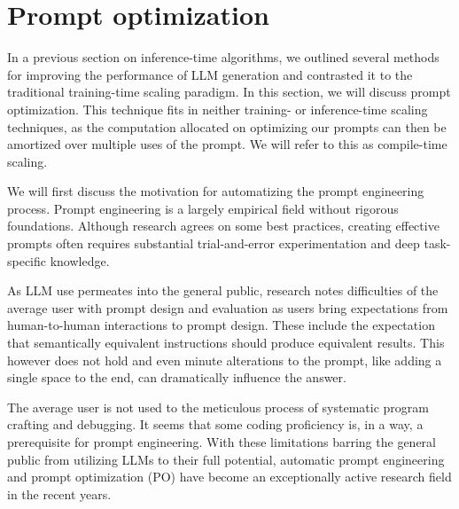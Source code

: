 \section{Prompt optimization}
In a previous section on inference-time algorithms, we outlined several methods for improving the performance of LLM generation
and contrasted it to the traditional training-time scaling paradigm. In this section, we will discuss prompt optimization. 
This technique fits in neither training- or inference-time scaling techniques, as the computation allocated on
optimizing our prompts can then be amortized over multiple uses of the prompt. 
We will refer to this as compile-time\cite{schnabel2024symbolicpromptprogramsearch} scaling.

We will first discuss the motivation for automatizing the prompt engineering process. 
Prompt engineering is a largely empirical field without rigorous foundations.
Although research agrees on some best practices, creating effective prompts 
often requires substantial trial-and-error experimentation and deep task-specific 
knowledge\cite{xiang2025selfsupervisedpromptoptimization}.

As LLM use permeates into the general public, research\cite{10.1145/3544548.3581388} notes difficulties 
of the average user with prompt design and evaluation as users bring expectations from human-to-human 
interactions to prompt design. These include the expectation that semantically equivalent instructions 
should produce equivalent results. This however does not hold and even minute
alterations to the prompt, like adding a single space to the end, can dramatically influence the answer\cite{zhuo2024prosaassessingunderstandingprompt}\cite{salinas2024butterflyeffectalteringprompts}.

The average user is not used to the meticulous process of systematic program crafting and debugging. It seems that
some coding proficiency is, in a way, a prerequisite for prompt engineering. With these limitations barring the general public from utilizing LLMs to their full potential,
automatic prompt engineering and prompt optimization (PO) have become an exceptionally active research field in the recent years.

